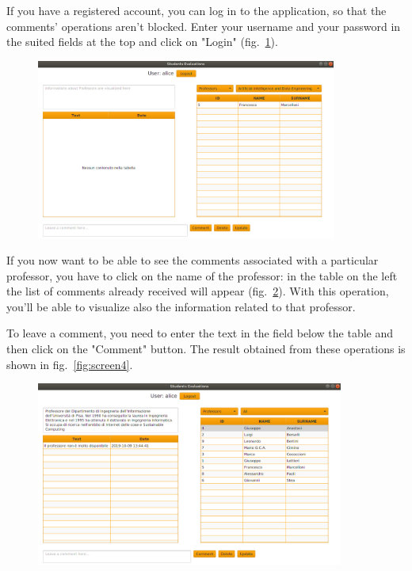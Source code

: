 \documentclass[a4paper]{article}
\begin{document}
If you have a registered account, you can log in to the application, so that the comments' operations aren't blocked. Enter your username and your password in the suited fields at the top and click on "Login" (fig.~\ref{fig:screenLogin}).
\begin{figure}[h]
\centering
\includegraphics[width=0.88\textwidth]{images/screens/screenLogin}
\label{fig:screenLogin}
\end{figure}

If you now want to be able to see the comments associated with a particular professor, you have to click on the name of the professor: in the table on the left the list of comments already received will appear (fig.~\ref{fig:screen3}). With this operation, you'll be able to visualize also the information related to that professor.

To leave a comment, you need to enter the text in the field below the table and then click on the "Comment" button. The result obtained from these operations is shown in fig.~\ref{fig:screen4}.

\begin{figure}
\centering
\includegraphics[width=0.9\textwidth]{images/screens/screen3}
\label{fig:screen3}
\end{figure}
\end{document}

